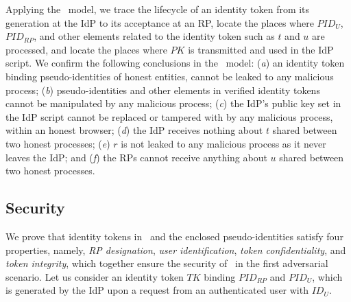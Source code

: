 \newc
Applying the \dyu\ model, we trace the lifecycle of an identity token from its generation at the IdP to its acceptance at an RP, locate the places where $PID_U$, $PID_{RP}$, and other elements related to the identity token such as $t$ and $u$ are processed, and locate the places where $PK$ is transmitted and used in the IdP script.
We confirm the following conclusions in the \dyu\ model:
 (\emph{a}) an identity token binding pseudo-identities of honest entities, cannot be leaked to any malicious process;
 (\emph{b}) pseudo-identities and other elements in verified identity tokens cannot be manipulated by any malicious process;
    (\emph{c}) the IdP's public key set in the IdP script cannot be replaced or tampered with by any malicious process, within an honest browser;
 (\emph{d}) the IdP receives nothing about $t$ shared between two honest processes;
 (\emph{e}) $r$ is not leaked to any malicious process as it never leaves the IdP;
and (\emph{f}) the RPs cannot receive anything about $u$ shared between two honest processes.



\subsection{Security}
\label{analysis-security}


We prove that identity tokens in \usso\ and the enclosed pseudo-identities satisfy four properties, namely, \emph{RP designation}, \emph{user identification}, \emph{token confidentiality}, and \emph{token integrity}, which together ensure the security of \usso\ in the first adversarial scenario.
Let us consider an identity token $TK$ binding $PID_{RP}$ and $PID_U$, which is generated by the IdP upon a request from an authenticated user with $ID_U$.


